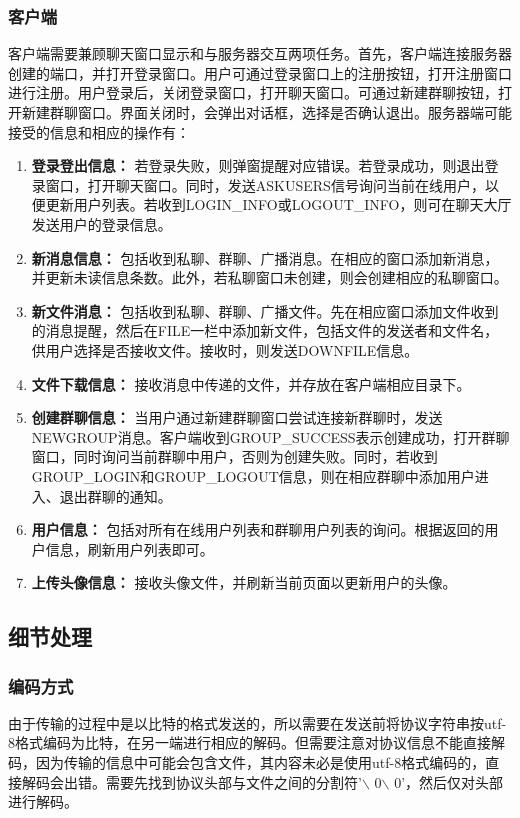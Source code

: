 \documentclass[12pt]{article} %
\begin{document}
\begin{sloppypar}
\subsubsection{客户端}

客户端需要兼顾聊天窗口显示和与服务器交互两项任务。首先，客户端连接服务器创建的端口，并打开登录窗口。用户可通过登录窗口上的注册按钮，打开注册窗口进行注册。用户登录后，关闭登录窗口，打开聊天窗口。可通过新建群聊按钮，打开新建群聊窗口。界面关闭时，会弹出对话框，选择是否确认退出。服务器端可能接受的信息和相应的操作有：
\begin{enumerate}
	\item {\bf 登录登出信息：} 若登录失败，则弹窗提醒对应错误。若登录成功，则退出登录窗口，打开聊天窗口。同时，发送ASKUSERS信号询问当前在线用户，以便更新用户列表。若收到LOGIN\_INFO或LOGOUT\_INFO，则可在聊天大厅发送用户的登录信息。
	\item {\bf 新消息信息：} 包括收到私聊、群聊、广播消息。在相应的窗口添加新消息，并更新未读信息条数。此外，若私聊窗口未创建，则会创建相应的私聊窗口。
	\item {\bf 新文件消息：} 包括收到私聊、群聊、广播文件。先在相应窗口添加文件收到的消息提醒，然后在FILE一栏中添加新文件，包括文件的发送者和文件名，供用户选择是否接收文件。接收时，则发送DOWNFILE信息。
	\item {\bf 文件下载信息：} 接收消息中传递的文件，并存放在客户端相应目录下。
	\item {\bf 创建群聊信息：} 当用户通过新建群聊窗口尝试连接新群聊时，发送NEWGROUP消息。客户端收到GROUP\_SUCCESS表示创建成功，打开群聊窗口，同时询问当前群聊中用户，否则为创建失败。同时，若收到GROUP\_LOGIN和GROUP\_LOGOUT信息，则在相应群聊中添加用户进入、退出群聊的通知。
	\item {\bf 用户信息：} 包括对所有在线用户列表和群聊用户列表的询问。根据返回的用户信息，刷新用户列表即可。
	\item {\bf 上传头像信息：} 接收头像文件，并刷新当前页面以更新用户的头像。
\end{enumerate}

\subsection{细节处理}

\subsubsection{编码方式}

由于传输的过程中是以比特的格式发送的，所以需要在发送前将协议字符串按utf-8格式编码为比特，在另一端进行相应的解码。但需要注意对协议信息不能直接解码，因为传输的信息中可能会包含文件，其内容未必是使用utf-8格式编码的，直接解码会出错。需要先找到协议头部与文件之间的分割符'$\backslash$ 0$\backslash$ 0'，然后仅对头部进行解码。


\end{sloppypar}
\end{document}
